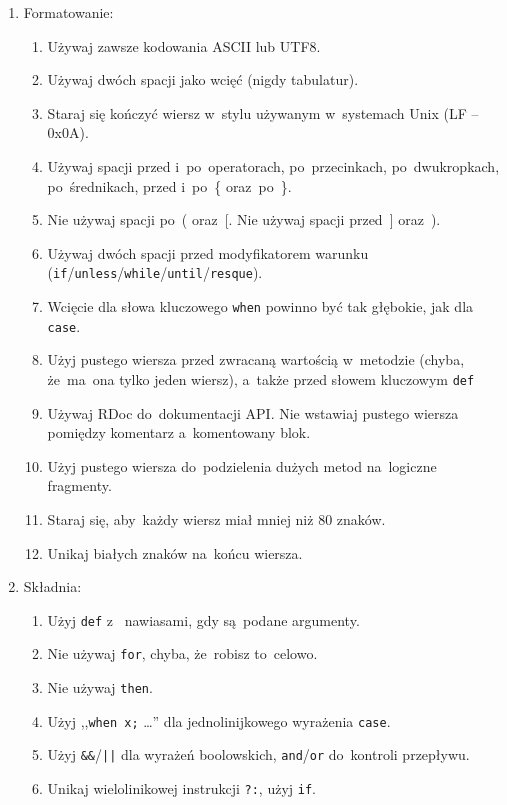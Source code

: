 \begin{enumerate}
  \item Formatowanie:
  \begin{enumerate}
    \item Używaj zawsze kodowania ASCII lub UTF8.
    \item Używaj dwóch spacji jako wcięć (nigdy tabulatur).
    \item Staraj się kończyć wiersz w~stylu używanym w~systemach Unix (LF -- 0x0A).
    \item Używaj spacji przed i~po~operatorach, po~przecinkach, po~dwukropkach, po~średnikach, przed i~po~\{ oraz~po~\}.
    \item Nie używaj spacji po~( oraz~[. Nie używaj spacji przed~] oraz~).
    \item Używaj dwóch spacji przed modyfikatorem warunku (\texttt{if}/\texttt{unless}/\texttt{while}/\texttt{until}/\texttt{resque}).
    \item Wcięcie dla słowa kluczowego \texttt{when} powinno być tak głębokie, jak dla \texttt{case}.
    \item Użyj pustego wiersza przed zwracaną wartością w~metodzie (chyba, że~ma~ona tylko jeden wiersz), a~także przed słowem kluczowym \texttt{def}
    \item Używaj RDoc do~dokumentacji API. Nie wstawiaj pustego wiersza pomiędzy komentarz a~komentowany blok.
    \item Użyj pustego wiersza do~podzielenia dużych metod na~logiczne fragmenty.
    \item Staraj się, aby~każdy wiersz miał mniej niż 80 znaków.
    \item Unikaj białych znaków na~końcu wiersza.
  \end{enumerate}
  \item Składnia:
  \begin{enumerate}
    \item Użyj \texttt{def} z~ nawiasami, gdy są~podane argumenty.
    \item Nie używaj \texttt{for}, chyba, że~robisz to~celowo.
    \item Nie używaj \texttt{then}.
    \item Użyj ,,\texttt{when x;} \ldots'' dla jednolinijkowego wyrażenia \texttt{case}.
    \item Użyj \texttt{\&\&}/\texttt{||} dla wyrażeń boolowskich, \texttt{and}/\texttt{or} do~kontroli przepływu.
    \item Unikaj wielolinikowej instrukcji \texttt{?:}, użyj \texttt{if}.

\end{enumerate}
\end{enumerate}
